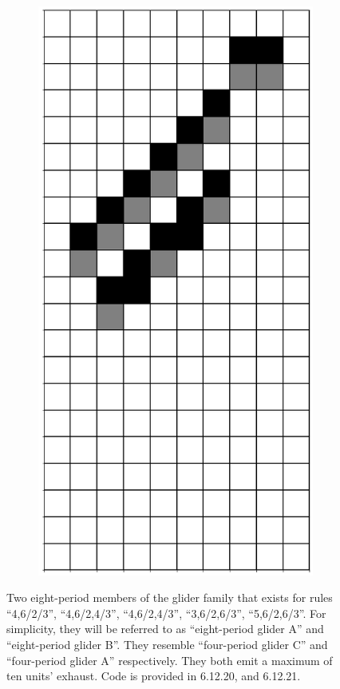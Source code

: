 \documentclass[12pt]{article}
\numberwithin{figure}{section} %
\begin{document}
\begin{figure}[H]
\begin{subfigure}{0.3\textwidth}
     \subcaption{}
   \end{subfigure}
        \begin{subfigure}{0.3\textwidth}
     \centering
     \includegraphics[angle=270,width=\linewidth]{Section4/23.8}
     \subcaption{}
   \end{subfigure}
   \setcounter{subfigure}{0}
   \caption{Two eight-period members of the glider family that exists for rules “4,6/2/3”, “4,6/2,4/3”, “4,6/2,4/3”, “3,6/2,6/3”, “5,6/2,6/3”. For simplicity, they will be referred to as “eight-period glider A” and “eight-period glider B”. They resemble “four-period glider C” and “four-period glider A” respectively. They both emit a maximum of ten units’ exhaust.  Code is provided in 6.12.20, and 6.12.21. }
   \vspace{-1.5em}
\end{figure}
\end{document}

